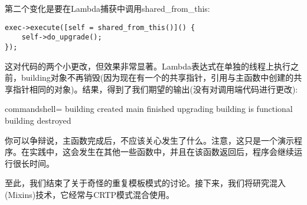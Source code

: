 第二个变化是要在Lambda捕获中调用shared\_from\_this:

\begin{lstlisting}[style=styleCXX]
exec->execute([self = shared_from_this()]() {
	self->do_upgrade();
});
\end{lstlisting}

这对代码的两个小更改，但效果非常显著。Lambda表达式在单独的线程上执行之前，building对象不再销毁(因为现在有一个的共享指针，引用与主函数中创建的共享指针相同的对象)。结果，得到了我们期望的输出(没有对调用端代码进行更改):

\begin{tcblisting}{commandshell={}}
building created
main finished
upgrading
building is functional
building destroyed
\end{tcblisting}

你可以争辩说，主函数完成后，不应该关心发生了什么。注意，这只是一个演示程序。在实践中，这会发生在其他一些函数中，并且在该函数返回后，程序会继续运行很长时间。

至此，我们结束了关于奇怪的重复模板模式的讨论。接下来，我们将研究混入(Mixins)技术，它经常与CRTP模式混合使用。





















